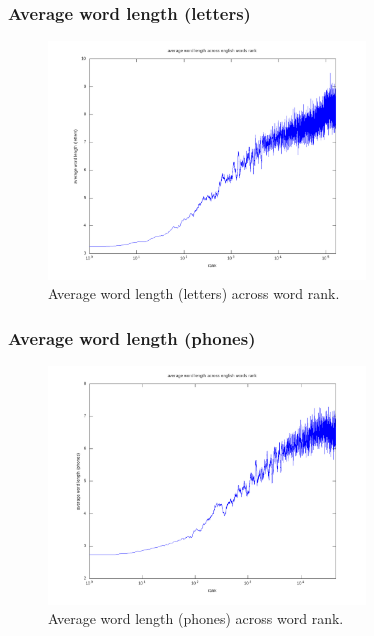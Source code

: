 \documentclass{beamer}
\begin{document}
\frame
{
  \frametitle{Average word length (letters)}
  \vspace{-0.2cm}
\begin{figure}[h!]
\centering
\includegraphics[width=0.75\textwidth]{images/averagewordslength_en.png}
\vspace{-0.2cm}
\caption{Average word length (letters) across word rank.}
\label{fig:averagewordslength_en}
\end{figure}   
}


\frame
{
  \frametitle{Average word length (phones)}
  \vspace{-0.2cm}
\begin{figure}[h!]
\centering
\includegraphics[width=0.75\textwidth]{images/averagewordsphoneslength_en.png}
\vspace{-0.2cm}
\caption{Average word length (phones) across word rank.}
\label{fig:averagewordsphoneslength_en}
\end{figure}   
}
\end{document}
